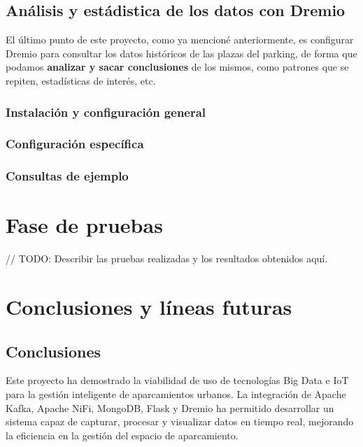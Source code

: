 \documentclass{../../../miPlantilla}
\begin{document}
\newpage

\subsection{Análisis y estádistica de los datos con Dremio}
El último punto de este proyecto, como ya mencioné anteriormente, es configurar Dremio para consultar los datos históricos de las plazas del parking, de forma que
podamos \textbf{analizar y sacar conclusiones} de los mismos, como patrones que se repiten, estadísticas de interés, etc. 

\subsubsection{Instalación y configuración general}

\subsubsection{Configuración específica}

\subsubsection{Consultas de ejemplo}

\newpage
\section{Fase de pruebas}
// TODO: Describir las pruebas realizadas y los resultados obtenidos aquí.

\section{Conclusiones y líneas futuras}
\subsection{Conclusiones}
Este proyecto ha demostrado la viabilidad de uso de tecnologías Big Data e IoT para la gestión inteligente de aparcamientos urbanos.
La integración de Apache Kafka, Apache NiFi, MongoDB, Flask y Dremio ha permitido desarrollar un sistema capaz de capturar, procesar
y visualizar datos en tiempo real, mejorando la eficiencia en la gestión del espacio de aparcamiento.
\end{document}
